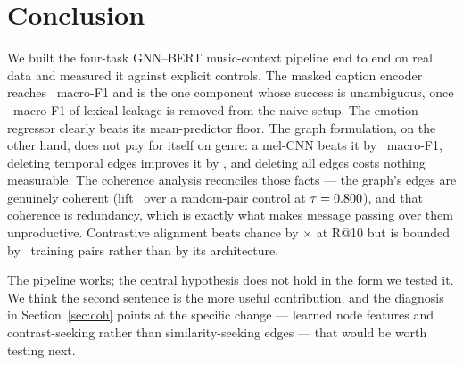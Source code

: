\documentclass[10pt,a4paper]{article}
\begin{document}
\section{Conclusion}
We built the four-task GNN--BERT music-context pipeline end to end on real data
and measured it against explicit controls. The masked caption encoder reaches
\tOneBertMaskMacroFOne\ macro-F1 and is the one component whose success is
unambiguous, once \tOneShortcutGap\ macro-F1 of lexical leakage is removed from
the naive setup. The emotion regressor clearly beats its mean-predictor floor.
The graph formulation, on the other hand, does not pay for itself on genre: a
mel-CNN beats it by \tTwoCnnOverBestGnn\ macro-F1, deleting temporal edges
improves it by \tTwoSimOverFull, and deleting all edges costs nothing measurable.
The coherence analysis reconciles those facts --- the graph's edges are
genuinely coherent (lift \gcLift\ over a random-pair control at
$\tau = 0.800$), and that coherence is redundancy, which is exactly what
makes message passing over them unproductive. Contrastive alignment beats chance
by \tFourTestLiftTen$\times$ at R@10 but is bounded by \tFourNTrain\ training
pairs rather than by its architecture.

The pipeline works; the central hypothesis does not hold in the form we tested
it. We think the second sentence is the more useful contribution, and the
diagnosis in Section~\ref{sec:coh} points at the specific change --- learned node
features and contrast-seeking rather than similarity-seeking edges --- that would
be worth testing next.
\end{document}
